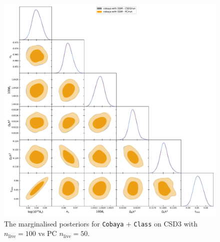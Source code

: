 \documentclass[draft,usenatbib]{mnras}
\begin{document}
\begin{landscape}
\begin{figure}
\centering %
\includegraphics[height=0.95\textheight]{./illustrations/cosmo-pc.pdf}
\caption{The marginalised posteriors for \texttt{Cobaya} +
\texttt{Class} on CSD3 with \(n_\text{live}=100\) vs PC
\(n_\text{live}=50\). } \label{fig:cosmology-pc}
\end{figure}
\end{landscape}



\end{document}
